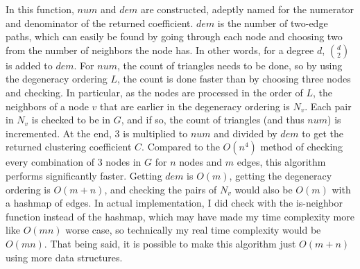 \documentclass{article}
\begin{document}
    \noindent In this function, $num$ and $dem$ are constructed, adeptly named 
    for the numerator and denominator of the returned coefficient. $dem$ is the
    number of two-edge paths, which can easily be found by going through each
    node and choosing two from the number of neighbors the node has. In other
    words, for a degree $d$, $d \choose 2$ is added to $dem$. For $num$, the
    count of triangles needs to be done, so by using the degeneracy ordering 
    $L$, the count is done faster than by choosing three nodes and checking.
    In particular, as the nodes are processed in the order of $L$, the neighbors
    of a node $v$ that are earlier in the degeneracy ordering is $N_v$. Each
    pair in $N_v$ is checked to be in $G$, and if so, the count of triangles 
    (and thus $num$) is incremented. At the end, 3 is multiplied to $num$ and
    divided by $dem$ to get the returned clustering coefficient $C$.
    \nextblurb 
    Compared to the $O(n^4)$ method of checking every combination of
    3 nodes in $G$ for $n$ nodes and $m$ edges, this algorithm performs 
    significantly faster. Getting $dem$ is $O(m)$, getting the degeneracy
    ordering is $O(m + n)$, and checking the pairs of $N_v$ would also be 
    $O(m)$ with a hashmap of edges. In actual implementation, I did check with
    the is-neighbor function instead of the hashmap, which may have made my 
    time complexity more like $O(mn)$ worse case, so technically my real time
    complexity would be $O(mn)$. That being said, it is possible to make this
    algorithm just $O(m + n)$ using more data structures.
\end{document}

